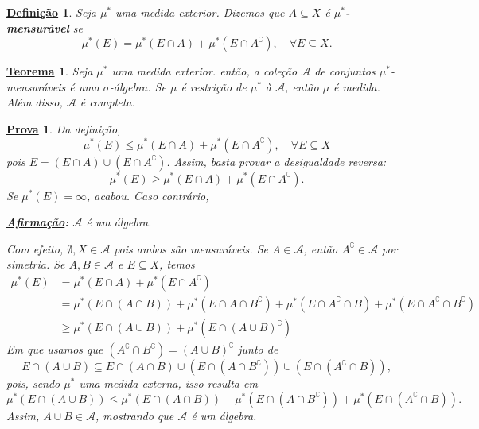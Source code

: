 \documentclass{article}
\newtheorem*{def*}{\underline{Defini\c c\~ao}}
\newtheorem*{theorem*}{\underline{Teorema}}
\newtheorem*{proof*}{\underline{Prova}}
\begin{document}
\begin{def*}
	Seja \(\mu ^{*}\) uma medida exterior. Dizemos que \(A\subseteq X\) é \(\mu ^{*}\)\textbf{-mensurável} se
	\[
		\mu ^{*}(E) = \mu ^{*}(E\cap A) + \mu ^{*}(E\cap A ^{\complement}),\quad \forall E\subseteq X.
	\]
\end{def*}
\begin{theorem*}
	Seja \(\mu ^{*}\) uma medida exterior. então, a coleção \(\mathcal{A}\) de conjuntos \(\mu ^{*}\)-mensuráveis é uma \(\sigma \)-álgebra. Se \(\mu \) é restrição de \(\mu ^{*}\) à \(\mathcal{A}\), então \(\mu \) é medida. Além disso,
	\(\mathcal{A}\) é completa.
\end{theorem*}
\begin{proof*}
	Da definição,
	\[
		\mu ^{*}(E) \leq \mu ^{*}(E\cap A) + \mu ^{*}(E\cap A ^{\complement}),\quad \forall E\subseteq X
	\]
	pois \(E = (E\cap A)\cup (E\cap A ^{\complement})\). Assim, basta provar a desigualdade reversa:
	\[
		\mu ^{*}(E) \geq \mu ^{*}(E\cap A) + \mu ^{*}(E\cap A ^{\complement}).
	\]
	Se \(\mu ^{*}(E) = \infty\), acabou. Caso contrário,

	\textbf{\underline{Afirmação}:} \(\mathcal{A}\) é um álgebra.

	Com efeito, \(\emptyset, X\in \mathcal{A}\) pois ambos são mensuráveis. Se \(A\in \mathcal{A}\), então \(A ^{\complement}\in \mathcal{A}\) por simetria. Se \(A, B\in \mathcal{A}\) e \(E\subseteq X\), temos
	\begin{align*}
		\mu ^{*}(E) & = \mu ^{*}(E\cap A) + \mu ^{*}(E\cap A ^{\complement})                                                                                                                \\
		            & = \mu ^{*}(E\cap (A\cap B)) + \mu ^{*}(E\cap A \cap B ^{\complement}) +\mu ^{*}(E\cap A ^{\complement}\cap B) + \mu ^{*}(E\cap A ^{\complement}\cap B ^{\complement}) \\
		            & \geq \mu ^{*}(E\cap (A\cup B)) + \mu ^{*}(E\cap (A\cup B)^{\complement})
	\end{align*}
	Em que usamos que \((A ^{\complement}\cap B ^{\complement}) = (A\cup B) ^{\complement}\) junto de
	\[
		E\cap (A\cup B)\subseteq E\cap (A\cap B)\cup (E\cap(A\cap B^{\complement}))\cup (E\cap(A ^{\complement}\cap B)),
	\]
	pois, sendo \(\mu ^{*}\) uma medida externa, isso resulta em
	\[
		\mu ^{*}(E\cap (A\cup B)) \leq \mu ^{*}(E\cap (A\cap B)) + \mu ^{*}(E\cap (A\cap B ^{\complement})) + \mu ^{*}(E\cap (A ^{\complement}\cap B)).
	\]
	Assim, \(A\cup B\in \mathcal{A}\), mostrando que \(\mathcal{A}\) é um álgebra.


\end{proof*}
\end{document}

